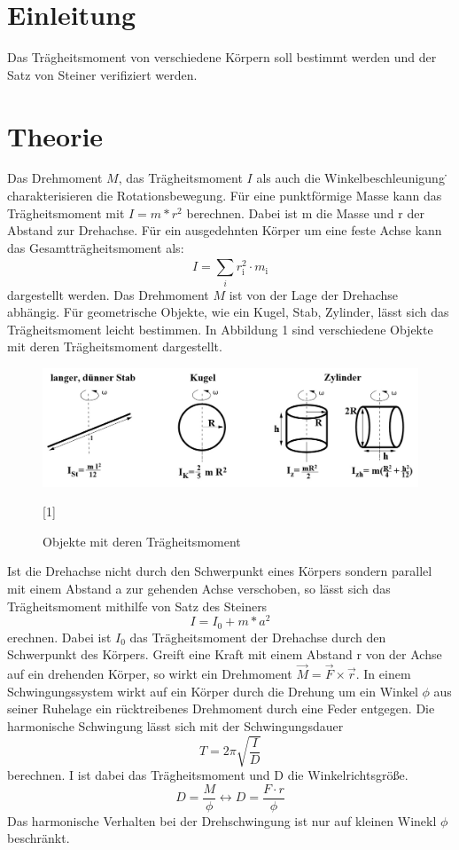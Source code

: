\section{Einleitung}
Das Trägheitsmoment von verschiedene Körpern soll bestimmt werden und der Satz von Steiner verifiziert werden.
\section{Theorie}
Das Drehmoment $M$, das Trägheitsmoment $I$ als auch die Winkelbeschleunigung \.{\omega} charakterisieren die Rotationsbewegung.
Für eine punktförmige Masse kann das Trägheitsmoment mit $I = m*r^2$ berechnen. Dabei ist m die Masse und r der Abstand zur Drehachse.
Für ein ausgedehnten Körper um eine feste Achse kann das Gesamtträgheitsmoment als:
\begin{equation}
  I=\sum \limits_{i}^{} r_\text{i}^2 \cdot m_\text{i}
\end{equation}
dargestellt werden.
Das Drehmoment $M$ ist von der Lage der Drehachse abhängig.
Für geometrische Objekte, wie ein Kugel, Stab, Zylinder, lässt sich das Trägheitsmoment
leicht bestimmen.
In Abbildung 1 sind verschiedene Objekte mit deren Trägheitsmoment dargestellt.
\begin{figure}[H]
\centering
\includegraphics[width=\textwidth]{Bild1.jpg}
\caption{Objekte mit deren Trägheitsmoment}[1]
\label{fig:Abb1}
\end{figure}
Ist die Drehachse nicht durch den Schwerpunkt eines Körpers sondern parallel mit einem Abstand a
zur gehenden Achse verschoben, so lässt sich das Trägheitsmoment mithilfe von Satz des Steiners
\begin{equation}
  I = I_\text{0} + m*a^2
\end{equation}
erechnen. Dabei ist $I_\text{0}$ das Trägheitsmoment der Drehachse durch den Schwerpunkt des Körpers.
Greift eine Kraft mit einem Abstand r von der Achse auf ein drehenden Körper, so wirkt ein Drehmoment $\vec{M} = \vec{F} \times \vec{r}$.
In einem Schwingungssystem wirkt auf ein Körper durch die Drehung um ein Winkel $\phi$ aus seiner Ruhelage ein rücktreibenes Drehmoment
durch eine Feder entgegen. Die harmonische Schwingung lässt sich mit der Schwingungsdauer
\begin{equation}
  T = 2\pi \sqrt{\frac{I}{D}}
\end{equation}
berechnen. I ist dabei das Trägheitsmoment und D die Winkelrichtsgröße.
\begin{equation}
  D = \frac{M}{\phi} \leftrightarrow D = \frac{F \cdot r}{\phi}
\end{equation}
Das harmonische Verhalten bei der Drehschwingung ist nur auf kleinen Winekl $\phi$
beschränkt.
